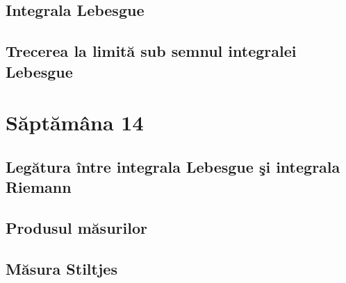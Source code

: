 \documentclass[a4paper,12pt]{article}
\theoremstyle{change}
\begin{document}
\subsection{Integrala Lebesgue}


\subsection{Trecerea la limită sub semnul integralei Lebesgue}

\section{Săptămâna 14}


\subsection{Legătura între integrala Lebesgue şi integrala Riemann}


\subsection{Produsul măsurilor}


\subsection{Măsura Stiltjes}
\end{document}
